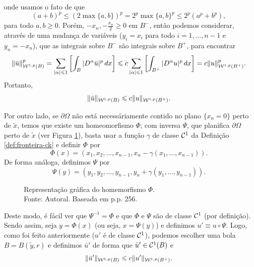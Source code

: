 \begin{prf}
\[    \]
    onde usamos o fato de que
    \[
        (a + b)^p \leqslant (2 \max\{a,b\})^p = 2^p \max\{a,b\}^p \leqslant 2^p (a^p + b^p),
    \]
    para todo $a,b \geqslant 0$. Porém, $-x_n, -\tfrac{x_n}{2} \geqslant 0$ em $B^-$, então podemos considerar, através de uma mudança de variáveis ($y_i = x_i$ para todo $i = 1,\dots,n-1$ e $y_n = -x_n$), que as integrais sobre $B^-$ são integrais sobre $B^+$, para encontrar
    \[
        \Vert \bar u \Vert_{\mathcal{W}^{1,p}(B)}^p = \sum_{|\alpha| \leqslant 1} \left[\int_B |D^\alpha \bar u| ^p \,dx\right] \leqslant c\sum_{|\alpha| \leqslant 1} \left[ \int_{B^+}|D^\alpha u|^p \,dx \right] = c \Vert u \Vert_{\mathcal{W}^{1,p}(B^+)}^p.
    \]
    Portanto,
    \[
        \Vert \bar u \Vert_{\mathcal{W}^{1,p}(B)} \leqslant c \Vert u \Vert_{\mathcal{W}^{1,p}(B^+)}.
    \]

    Por outro lado, se $\partial\Omega$ não está necessáriamente contido no plano $\{x_n = 0\}$ perto de $\tilde x$, temos que existe um homeomorfismo $\Phi$, com inversa $\Psi$, que planifica $\partial \Omega$ perto de $\tilde x$ (ver Figura \ref{fig:homeomorfismo}),  basta usar a função $\gamma$ de classe $\mathcal{C}^1$ da Definição \ref{def:fronteira-ck} e definir $\Phi$ por
    \begin{equation} \label{eq:Phi}
        \Phi(x) = (x_1,x_2,...,x_{n-1}, x_n - \gamma(x_1,\dots,x_{n-1})).
    \end{equation}
    De forma análoga, definimos $\Psi$ por
    \begin{equation} \label{eq:Psi}
        \Psi(y) = (y_1,y_2,\dots,y_{n-1},y_n + \gamma(y_1,\dots,y_{n-1})).
    \end{equation}
    \begin{figure}
        \centering
        
        \caption{Representação gráfica do homemorfismo $\Phi$.\\Fonte: Autoral. Baseada em \cite{evans-pde} p.p. 256.}
        \label{fig:homeomorfismo}
    \end{figure}
    \!\!Deste modo, é fácil ver que $\Psi^{-1} = \Phi$ e que $\Phi$ e $\Psi$ são de classe $\mathcal{C}^1$ (por definição). Sendo assim, seja $y = \Phi(x)$ (ou seja, $x = \Psi(y)$) e definimos $u' \equiv u \circ \Psi$. Logo, como foi feito anteriormente ($u'$ é de classe $\mathcal{C}^1$), podemos escolher uma bola $B = B(\tilde y, r)$ e definimos $\bar u'$ de forma que $\bar u' \in \mathcal{C}^1(B)$ e
    \begin{equation} \label{eq:BBBB}
        \Vert \bar u' \Vert_{\mathcal{W}^{1,p}(B)} \leqslant c \Vert u' \Vert_{\mathcal{W}^{1,p}(B^+)}.
    \end{equation}

\end{prf}
